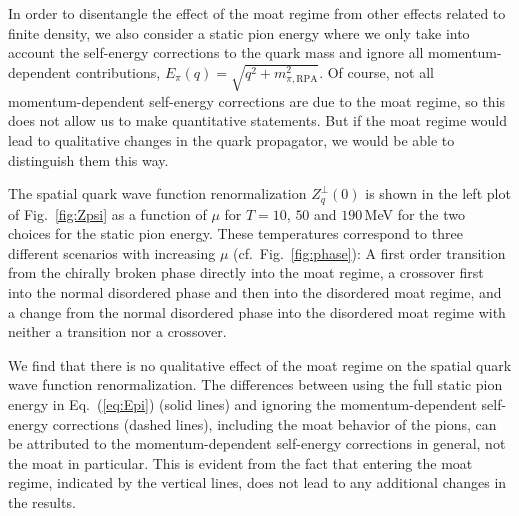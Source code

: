 \documentclass[reprint,english,superscriptaddress,preprintnumbers,amsmath,amssymb,aps,prd]{revtex4-2}
\def\Eq#1{Eq.~(\ref{#1})}
\def\Fig#1{Fig.~\ref{#1}}
\begin{document}
In order to disentangle the effect of the moat regime from other effects related to finite density, we also consider a static pion energy where we only take into account the self-energy corrections to the quark mass and ignore all momentum-dependent contributions, $E_\pi(q) =\sqrt{q^2+m^2_{\pi,\mathrm{RPA}}}$. Of course, not all momentum-dependent self-energy corrections are due to the moat regime, so this does not allow us to make quantitative statements. But if the moat regime would lead to qualitative changes in the quark propagator, we would be able to distinguish them this way. 

The spatial quark wave function renormalization $Z^\perp_q(0)$ is shown in the left plot of \Fig{fig:Zpsi} as a function of $\mu$ for $T=10$, $50$ and $190$\,MeV for the two choices for the static pion energy. These temperatures correspond to three different scenarios with increasing $\mu$ (cf.\  \Fig{fig:phase}): A first order transition from the chirally broken phase directly into the moat regime, a crossover first into the normal disordered phase and then into the disordered moat regime, and a change from the normal disordered phase into the disordered moat regime with neither a transition nor a crossover.

We find that there is no qualitative effect of the moat regime on the spatial quark wave function renormalization. The differences between using the full static pion energy in \Eq{eq:Epi} (solid lines) and ignoring the momentum-dependent self-energy corrections (dashed lines), including the moat behavior of the pions, can be attributed to the momentum-dependent self-energy corrections in general, not the moat in particular. This is evident from the fact that entering the moat regime, indicated by the vertical lines, does not lead to any additional changes in the results.
\end{document}
